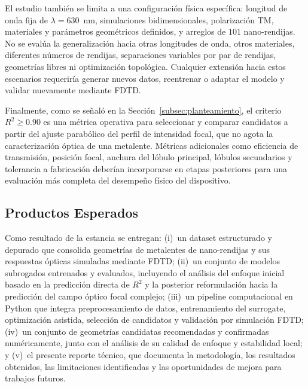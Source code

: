 El estudio también se limita a una configuración física específica: longitud de onda fija de $\lambda = 630$~nm, simulaciones bidimensionales, polarización TM, materiales y parámetros geométricos definidos, y arreglos de $101$ nano-rendijas. No se evalúa la generalización hacia otras longitudes de onda, otros materiales, diferentes números de rendijas, separaciones variables por par de rendijas, geometrías libres ni optimización topológica. Cualquier extensión hacia estos escenarios requeriría generar nuevos datos, reentrenar o adaptar el modelo y validar nuevamente mediante FDTD.

Finalmente, como se señaló en la Sección~\ref{subsec:planteamiento}, el criterio $R^2 \geq 0.90$ es una métrica operativa para seleccionar y comparar candidatos a partir del ajuste parabólico del perfil de intensidad focal, que no agota la caracterización óptica de una metalente. Métricas adicionales como eficiencia de transmisión, posición focal, anchura del lóbulo principal, lóbulos secundarios y tolerancia a fabricación deberían incorporarse en etapas posteriores para una evaluación más completa del desempeño físico del dispositivo.

\subsection{Productos Esperados}\label{subsec:productos}

Como resultado de la estancia se entregan: (i)~un dataset estructurado y depurado que consolida geometrías de metalentes de nano-rendijas y sus respuestas ópticas simuladas mediante FDTD; (ii)~un conjunto de modelos subrogados entrenados y evaluados, incluyendo el análisis del enfoque inicial basado en la predicción directa de $R^2$ y la posterior reformulación hacia la predicción del campo óptico focal complejo; (iii)~un pipeline computacional en Python que integra preprocesamiento de datos, entrenamiento del surrogate, optimización asistida, selección de candidatos y validación por simulación FDTD; (iv)~un conjunto de geometrías candidatas recomendadas y confirmadas numéricamente, junto con el análisis de su calidad de enfoque y estabilidad local; y (v)~el presente reporte técnico, que documenta la metodología, los resultados obtenidos, las limitaciones identificadas y las oportunidades de mejora para trabajos futuros.

